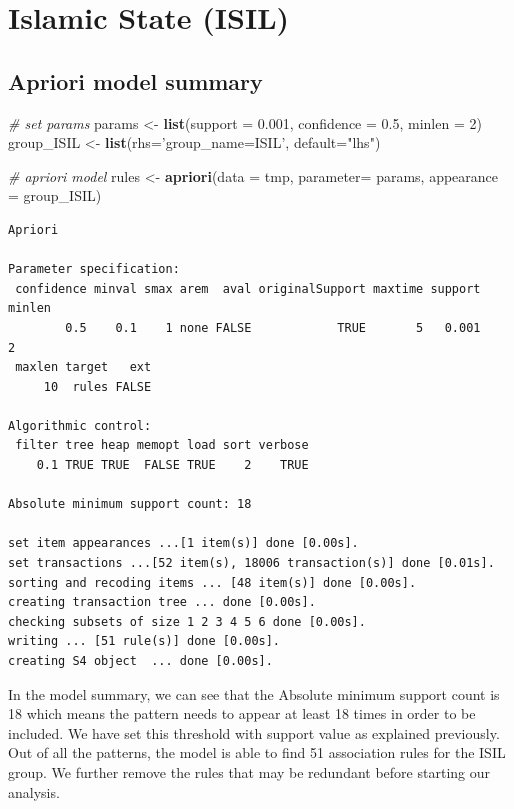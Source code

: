 \documentclass[11pt,oneside,a4paper]{reedthesis}
\newenvironment{Shaded}{\begin{snugshade}}{\end{snugshade}}
\newcommand{\KeywordTok}[1]{\textcolor[rgb]{0.13,0.29,0.53}{\textbf{#1}}}
\newcommand{\DataTypeTok}[1]{\textcolor[rgb]{0.13,0.29,0.53}{#1}}
\newcommand{\DecValTok}[1]{\textcolor[rgb]{0.00,0.00,0.81}{#1}}
\newcommand{\FloatTok}[1]{\textcolor[rgb]{0.00,0.00,0.81}{#1}}
\newcommand{\StringTok}[1]{\textcolor[rgb]{0.31,0.60,0.02}{#1}}
\newcommand{\CommentTok}[1]{\textcolor[rgb]{0.56,0.35,0.01}{\textit{#1}}}
\newcommand{\NormalTok}[1]{#1}
\begin{document}
\section{Islamic State (ISIL)}\label{islamic-state-isil}

\subsection{Apriori model summary}\label{apriori-model-summary}
\begin{Shaded}
\begin{Highlighting}[]
\CommentTok{# set params}
\NormalTok{params <-}\StringTok{ }\KeywordTok{list}\NormalTok{(}\DataTypeTok{support =} \FloatTok{0.001}\NormalTok{, }\DataTypeTok{confidence =} \FloatTok{0.5}\NormalTok{, }\DataTypeTok{minlen =} \DecValTok{2}\NormalTok{)}
\NormalTok{group_ISIL <-}\StringTok{ }\KeywordTok{list}\NormalTok{(}\DataTypeTok{rhs=}\StringTok{'group_name=ISIL'}\NormalTok{, }\DataTypeTok{default=}\StringTok{"lhs"}\NormalTok{)}

\CommentTok{# apriori model}
\NormalTok{rules <-}\StringTok{ }\KeywordTok{apriori}\NormalTok{(}\DataTypeTok{data =}\NormalTok{ tmp, }\DataTypeTok{parameter=}\NormalTok{ params, }\DataTypeTok{appearance =}\NormalTok{ group_ISIL)}
\end{Highlighting}
\end{Shaded}
\begin{verbatim}
Apriori

Parameter specification:
 confidence minval smax arem  aval originalSupport maxtime support minlen
        0.5    0.1    1 none FALSE            TRUE       5   0.001      2
 maxlen target   ext
     10  rules FALSE

Algorithmic control:
 filter tree heap memopt load sort verbose
    0.1 TRUE TRUE  FALSE TRUE    2    TRUE

Absolute minimum support count: 18 

set item appearances ...[1 item(s)] done [0.00s].
set transactions ...[52 item(s), 18006 transaction(s)] done [0.01s].
sorting and recoding items ... [48 item(s)] done [0.00s].
creating transaction tree ... done [0.00s].
checking subsets of size 1 2 3 4 5 6 done [0.00s].
writing ... [51 rule(s)] done [0.00s].
creating S4 object  ... done [0.00s].
\end{verbatim}
In the model summary, we can see that the Absolute minimum support count
is 18 which means the pattern needs to appear at least 18 times in order
to be included. We have set this threshold with support value as
explained previously. Out of all the patterns, the model is able to find
51 association rules for the ISIL group. We further remove the rules
that may be redundant before starting our analysis.
\end{document}
